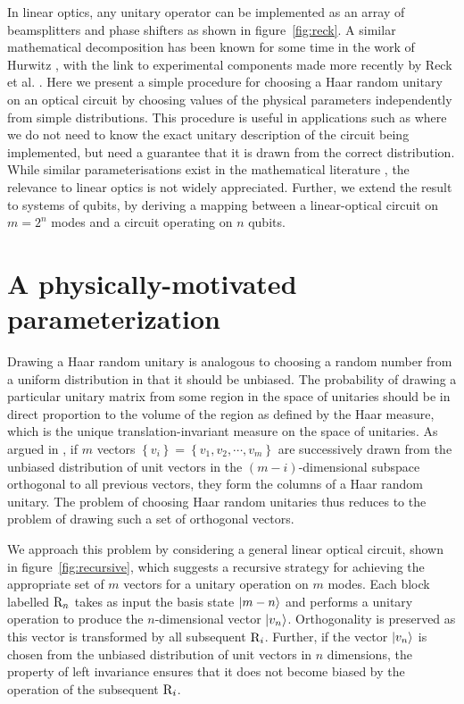 In linear optics, any unitary operator can be implemented as an array of
beamsplitters and phase shifters as shown in figure~\ref{fig:reck}. A similar
mathematical decomposition has been known for some time in the work of Hurwitz
\cite{hurwitz}, with the link to experimental components made more recently by
Reck et al. \cite{reck}. Here we present a simple procedure for choosing
a Haar random unitary on an optical circuit by choosing values of the physical
parameters independently from simple distributions. This procedure is useful in
applications such as \bosonsampling{} where we do not need to know the exact
unitary description of the circuit being implemented, but need a guarantee that
it is drawn from the correct distribution. While similar parameterisations exist
in the mathematical literature \cite{spengler2012, zy-jpa-27-4235}, the
relevance to linear optics is not widely appreciated. Further, we extend the
result to systems of qubits, by deriving a mapping between a linear-optical
circuit on \(m=2^{n}\) modes and a circuit operating on \(n\) qubits.

\section{A physically-motivated parameterization}
\label{sec:Parameterization}
Drawing a Haar random unitary is analogous to choosing a random number from a
uniform distribution in that it should be unbiased. The probability of drawing
a particular unitary matrix from some region in the space of unitaries should
be in direct proportion to the volume of the region as defined by the Haar
measure, which is the unique translation-invariant measure on the space of
unitaries. As argued in \cite{reffy}, if \(m\) vectors \(\left\{
v_{i} \right\} = \left\{ v_{1}, v_{2}, \cdots, v_{m} \right\}\) are successively
drawn from the unbiased distribution of unit vectors in the
\(\left(m-i\right)\)-dimensional subspace orthogonal to all previous vectors,
they form the columns of a Haar random unitary. The problem of choosing Haar
random unitaries thus reduces to the problem of drawing such a set of orthogonal
vectors.

We approach this problem by considering a general linear optical circuit, shown
in figure~\ref{fig:recursive}, which suggests a recursive strategy for
achieving the appropriate set of \(m\) vectors for a unitary operation on \(m\)
modes. Each block labelled \(\mathrm{R}_{n}\) takes
as input the basis state \( \left|m-n\right\rangle\) and performs a unitary operation to
produce the \(n\)-dimensional vector \(\left|v_n\right\rangle\). Orthogonality is preserved
as this vector is transformed by all subsequent \(\mathrm{R}_{i}\). Further, if the
vector \(\left|v_{n}\right\rangle\) is chosen from the unbiased distribution of unit vectors
in \(n\) dimensions, the property of left invariance ensures that it does not
become biased by the operation of the subsequent \(\mathrm{R}_{i}\).

